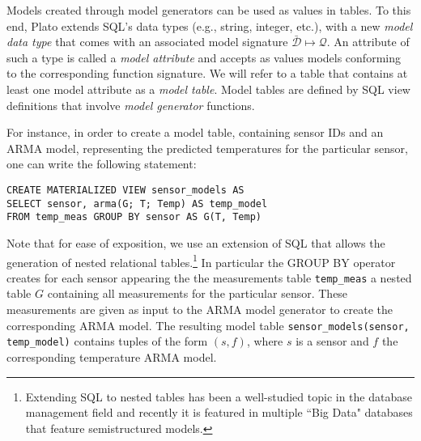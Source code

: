 Models created through model generators can be used as values in tables. To this end, Plato extends SQL's data types (e.g., string, integer, etc.), with a new {\em model data type} that comes with an associated model signature $\mathcal{\bar{D}}\mapsto \mathcal{Q}$. An attribute of such a type is called a {\em model attribute} and accepts as values models conforming to the corresponding function signature. We will refer to a table that contains at least one model attribute as a {\em model table}. Model tables are defined by SQL view definitions that involve {\em model generator} functions. 

\vspace*{0.5cm}
\begin{example}
\label{xmpl:models-and-definitions}
For instance, in order to create a model table, containing sensor IDs and an ARMA model, representing the predicted temperatures for the particular sensor, one can write the following statement:

\begin{verbatim}
CREATE MATERIALIZED VIEW sensor_models AS 
SELECT sensor, arma(G; T; Temp) AS temp_model
FROM temp_meas GROUP BY sensor AS G(T, Temp)
\end{verbatim}

Note that for ease of exposition, we use an extension of SQL that allows the generation of nested relational tables.\footnote{Extending SQL to nested tables has been a well-studied topic in the database management field and recently it is featured in multiple ``Big Data" databases that feature semistructured models. 
}
In particular the GROUP BY operator creates for each sensor appearing the the measurements table \texttt{temp\_meas} a nested table $G$ containing all measurements for the particular sensor. These measurements are given as input to the ARMA model generator to create the corresponding ARMA model.
The resulting model table \texttt{sensor\_models(sensor, temp\_model)} contains tuples of the form $(s, f)$, where $s$ is a sensor and $f$ the corresponding temperature ARMA model.
\end{example}
\vspace*{0.5cm}

